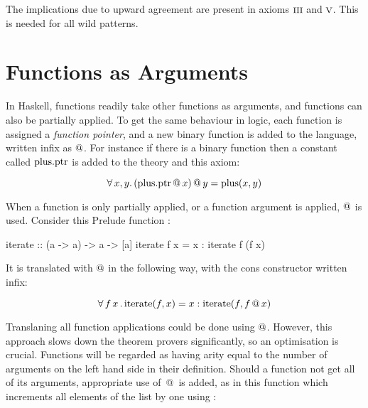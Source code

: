 \begin{comment}
Some room for improvement can be seen: the inserted
\hs{even }$\bot$\hs{ = }$\bot$ case is redundant as it is implied by
the wild pattern to $\bot$.
\end{comment}

The implications due to upward agreement are present in axioms
$\romnodot{3}$ and $\romnodot{5}$. This is needed for all wild
patterns.

\section{Functions as Arguments}

In Haskell, functions readily take other functions as arguments, and
functions can also be partially applied. To get the same behaviour in
logic, each function is assigned a \emph{function pointer}, and a new
binary function is added to the language, written infix as $@$.
For instance if there is a binary function  then a constant
called $\mathrm{plus.ptr}$ is added to the theory and this axiom:

\begin{equation*}
\forall \, x , y . \,  (\mathrm{plus.ptr} \, @ \, x) \, @ \, y = \mathrm{plus}(x,y)
\end{equation*}

When a function is only partially applied, or a function argument is
applied, $@$ is used. Consider this Prelude function :

\begin{code}
iterate :: (a -> a) -> a -> [a]
iterate f x = x : iterate f (f x)
\end{code}

It is translated with $@$ in the following way, with the cons
constructor \hs{:} written infix:

\begin{equation*}
\forall \, f \, x \, . \, \mathrm{iterate}(f,x) = x : \mathrm{iterate}(f,f \, @ \, x)
\end{equation*}

Translaning all function applications could be done using
$@$. However, this approach slows down the theorem provers
significantly, so an optimisation is crucial. Functions will be
regarded as having arity equal to the number of arguments on the left
hand side in their definition. Should a function not get all of its
arguments, appropriate use of $\, @ \, $ is added, as in this function
which increments all elements of the list by one using :

